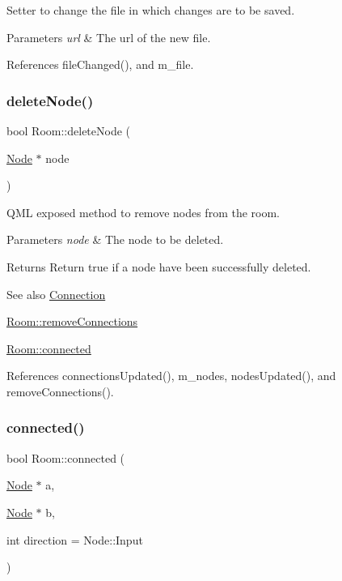 Setter to change the file in which changes are to be saved. 


\begin{DoxyParams}{Parameters}
{\em url} & The url of the new file. \\
\hline
\end{DoxyParams}


References file\+Changed(), and m\+\_\+file.

\mbox{\label{classRoom_adbcc976eefed696d0536773e75c4f7d2}} 
\subsubsection{\texorpdfstring{delete\+Node()}{deleteNode()}}
{\footnotesize\ttfamily bool Room\+::delete\+Node (\begin{DoxyParamCaption}\item[{\mbox{\hyperlink{classNode}{Node}} $\ast$}]{node }\end{DoxyParamCaption})}



Q\+ML exposed method to remove nodes from the room. 


\begin{DoxyParams}{Parameters}
{\em node} & The node to be deleted. \\
\hline
\end{DoxyParams}
\begin{DoxyReturn}{Returns}
Return true if a node have been successfully deleted. 
\end{DoxyReturn}
\begin{DoxySeeAlso}{See also}
\mbox{\hyperlink{classConnection}{Connection}} 

\mbox{\hyperlink{classRoom_a0b0b13f4ebd1c45353090b6ac64ed433}{Room\+::remove\+Connections}} 

\mbox{\hyperlink{classRoom_aaaeb040b9fa13894f4c19fb1eecbefd2}{Room\+::connected}} 
\end{DoxySeeAlso}


References connections\+Updated(), m\+\_\+nodes, nodes\+Updated(), and remove\+Connections().

\mbox{\label{classRoom_aaaeb040b9fa13894f4c19fb1eecbefd2}} 
\subsubsection{\texorpdfstring{connected()}{connected()}}
{\footnotesize\ttfamily bool Room\+::connected (\begin{DoxyParamCaption}\item[{\mbox{\hyperlink{classNode}{Node}} $\ast$}]{a,  }\item[{\mbox{\hyperlink{classNode}{Node}} $\ast$}]{b,  }\item[{int}]{direction = {\ttfamily Node\+:\+:Input} }\end{DoxyParamCaption})}



